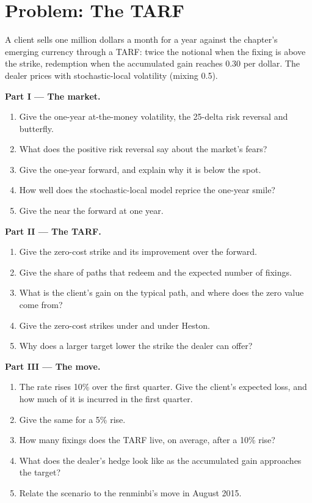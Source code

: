 \section{Problem: The TARF}

\begin{problem}\label{pb:dv:fx-derivatives:1}
A client sells one million dollars a month for a year against the chapter's emerging currency through a TARF: twice the notional when the fixing is
above the strike, redemption when the accumulated gain reaches 0.30 per dollar. The dealer prices with stochastic-local volatility (mixing 0.5).

\medskip\noindent\textbf{Part I --- The market.}
\begin{enumerate}
\item Give the one-year at-the-money volatility, the 25-delta risk reversal and butterfly.
\item What does the positive risk reversal say about the market's fears?
\item Give the one-year forward, and explain why it is below the spot.
\item How well does the stochastic-local model reprice the one-year smile?
\item Give the  near the forward at one year.
\end{enumerate}

\medskip\noindent\textbf{Part II --- The TARF.}
\begin{enumerate}[resume]
\item Give the zero-cost strike and its improvement over the forward.
\item Give the share of paths that redeem and the expected number of fixings.
\item What is the client's gain on the typical path, and where does the zero value come from?
\item Give the zero-cost strikes under  and under Heston.
\item Why does a larger target lower the strike the dealer can offer?
\end{enumerate}

\medskip\noindent\textbf{Part III --- The move.}
\begin{enumerate}[resume]
\item The rate rises 10\% over the first quarter. Give the client's expected loss, and how much of it is incurred in the first quarter.
\item Give the same for a 5\% rise.
\item How many fixings does the TARF live, on average, after a 10\% rise?
\item What does the dealer's hedge look like as the accumulated gain approaches the target?
\item Relate the scenario to the renminbi's move in August 2015.
\end{enumerate}


\end{problem}
